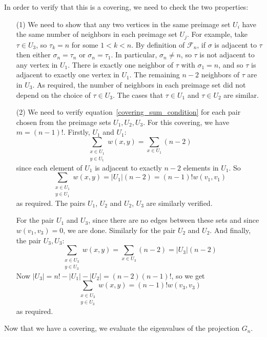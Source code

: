 \noindent In order to verify that this is a covering, we need to check the two properties:
\begin{itemize}
\item[(1)]  We need to show that any two vertices in the same preimage set $U_i$ have
  the same number of neighbors in each preimage set $U_j$.  For example, take
  $\tau \in U_3$, so $\tau_k = n$ for some $1 < k < n$.  By definition of
  $\mathcal{F}_n$, if $\sigma$ is adjacent to $\tau$ then either
  $\sigma_n = \tau_n$ or $\sigma_n = \tau_1$.  In particular,
  $\sigma_n \neq n$, so $\tau$ is not adjacent to any vertex in $U_1$.
  There is exactly one neighbor of $\tau$ with $\sigma_1 = n$, and
  so $\tau$ is adjacent to exactly one vertex in $U_1$.  The remaining
  $n-2$ neighbors of $\tau$ are in $U_3$.  As required, the number of neighbors in each
  preimage set did not depend on the choice of $\tau \in U_3$.
  The cases that $\tau \in U_1$ and $\tau \in U_2$ are similar.
 
 \item[(2)]  We need to verify equation~\ref{covering_sum_condition} for each
   pair chosen from the preimage sets $U_1, U_2, U_3$.  
 For this covering, we have $m=(n-1)!$. 
 Firstly, $U_1$ and $U_1$:
  \[ \sum_{\substack{x \in U_1 \\ y \in U_1}} w(x,y) = \sum_{x \in U_1} (n-2)\]
 since each element of $U_1$ is adjacent to exactly $n-2$ elements in $U_1$.
 So 
  \[ \sum_{\substack{x \in U_1 \\ y \in U_1}} w(x,y) = |U_1| (n-2) = (n-1)! w(v_1,v_1)\]
 as required.  The pairs $U_1$, $U_2$ and $U_2$, $U_3$ are similarly verified.
 
 For the pair $U_1$ and $U_3$, since there are no edges between these sets
and since $w(v_1,v_3) = 0$, we are done.  Similarly for the pair $U_2$ and $U_2$.
 And finally, the pair $U_3, U_3$:
  \[\sum_{\substack{x \in U_3 \\ y \in U_3}} w(x,y) = \sum_{x \in U_3} (n-2) = |U_3|(n-2)\]
 Now  $|U_3| = n! - |U_1| - |U_2| = (n-2) (n-1)!$, so we get
  \[\sum_{\substack{x \in U_3 \\ y \in U_3}} w(x,y)  = (n-1)! w(v_3,v_3)\]
 as required.  
 
\end{itemize}
Now that we have a covering, we evaluate the eigenvalues of the projection $G_n$.

